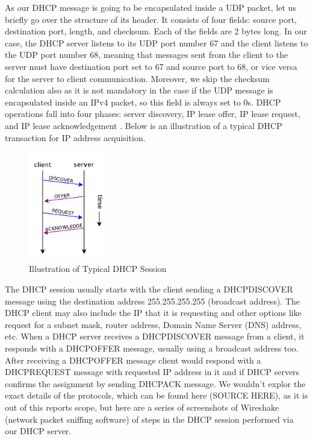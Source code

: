 As our DHCP message is going to be encapsulated inside a UDP packet, let us briefly go over the structure of its header. It consists of four fields: source port, destination port, length, and checksum. Each of the fields are 2 bytes long. In our case, the DHCP server listens to its UDP port number 67 and the client listens to the UDP port number 68, meaning that messages sent from the client to the server must have destination port set to 67 and source port to 68, or vice versa for the server to client communication. Moreover, we skip the checksum calculation also as it is not mandatory in the case if the UDP message is encapsulated inside an IPv4 packet, so this field is always set to 0s.
DHCP operations fall into four phases: server discovery, IP lease offer, IP lease request, and IP lease acknowledgement \cite{book-computer-networks}. Below is an illustration of a typical DHCP transaction for IP address acquisition.

\begin{figure}[htp]
\begin{center}
\includegraphics[width=0.3\textwidth]{DHCP_session}
\end{center}
\caption{Illustration of Typical DHCP Session}
\label{ethernet-port}
\end{figure}

The DHCP session usually starts with the client sending a DHCPDISCOVER message using the destination address 255.255.255.255 (broadcast address). The DHCP client may also include the IP that it is requesting and other options like request for a subnet mask, router address, Domain Name Server (DNS) address, etc. When a DHCP server receives a DHCPDISCOVER message from a client, it responds with a DHCPOFFER message, usually using a broadcast address too. After receiving a DHCPOFFER message client would respond with a DHCPREQUEST message with requested IP address in it and if DHCP servers confirms the assignment by sending DHCPACK message. We wouldn't explor the exact details of the protocols, which can be found here (SOURCE HERE), as it is out of this reports scope, but here are a series of screenshots of Wireshake (network packet sniffing software) of steps in the DHCP session performed via our DHCP server.

